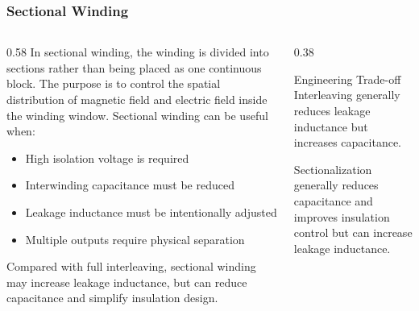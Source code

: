 \begin{frame}
    \frametitle{Sectional Winding}

    \begin{columns}
        \begin{column}{0.58\textwidth}
            In sectional winding, the winding is divided into sections rather than being placed as one continuous block. The purpose is to control the spatial distribution of magnetic field and electric field inside the winding window.
            Sectional winding can be useful when:
            \begin{itemize}
                \item High isolation voltage is required
                \item Interwinding capacitance must be reduced
                \item Leakage inductance must be intentionally adjusted
                \item Multiple outputs require physical separation
            \end{itemize}

            Compared with full interleaving, sectional winding may increase leakage inductance, but can reduce capacitance and simplify insulation design.
        \end{column}

        \begin{column}{0.38\textwidth}
            \begin{block}{Engineering Trade-off}
                \small
                Interleaving generally reduces leakage inductance but increases capacitance.

                \vspace{0.15cm}

                Sectionalization generally reduces capacitance and improves insulation control but can increase leakage inductance.
            \end{block}
        \end{column}
    \end{columns}
\end{frame}


